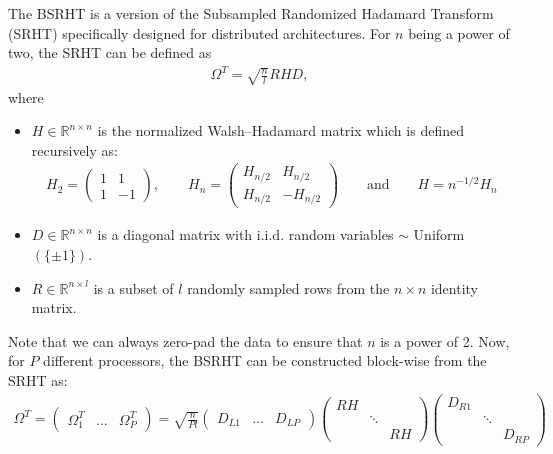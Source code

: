 \documentclass{article}
\theoremstyle{definition}
\begin{document}
The BSRHT is a version of the Subsampled Randomized Hadamard Transform (SRHT) specifically designed for distributed architectures. For $n$ being a power of two, the SRHT can be defined as
\begin{align*}
    \Omega^T = \sqrt{\frac{n}{l}} R H D,
\end{align*}
where
\begin{itemize}
    \item $H\in \mathbb{R}^{n \times n}$ is the normalized Walsh–Hadamard matrix which is defined recursively as:
    \begin{align*}
        H_2 = \begin{pmatrix}
            1 & 1 \\
            1 & -1
        \end{pmatrix}, 
        \qquad
        H_n = \begin{pmatrix}
            H_{n/2} & H_{n/2}\\
            H_{n/2} & -H_{n/2}
        \end{pmatrix}
        \qquad \text{and} \qquad
        H = n^{-1/2} H_n
    \end{align*}
    \item $D\in \mathbb{R}^{n \times n}$ is a diagonal matrix with i.i.d. random variables $\sim$ Uniform$(\{\pm 1\})$.
    \item $R\in \mathbb{R}^{n \times l}$ is a subset of $l$ randomly sampled rows from the $n \times n$ identity matrix.
\end{itemize}
Note that we can always zero-pad the data to ensure that $n$ is a power of 2. Now, for $P$ different processors, the BSRHT can be constructed block-wise from the SRHT as:
\begin{align}
    \label{BRSHT}
    \Omega^T
    = \begin{pmatrix}
        \Omega_1^T & \ldots & \Omega_P^T 
    \end{pmatrix} 
    = \sqrt{\frac{n}{Pl}} 
    \begin{pmatrix}
        D_{L1} & \ldots & D_{LP} 
    \end{pmatrix} 
    \begin{pmatrix}
        RH \\
        & \ddots \\
        && RH
    \end{pmatrix}
    \begin{pmatrix}
        D_{R1}\\
        & \ddots \\
        && D_{RP}
    \end{pmatrix}
\end{align}
\end{document}
